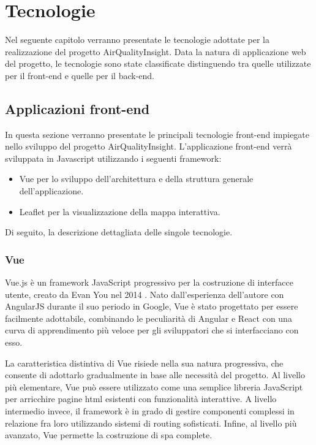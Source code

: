 \clearpage{\pagestyle{empty}\cleardoublepage}

\chapter{Tecnologie}
\label{chapter:second}

Nel seguente capitolo verranno presentate le tecnologie adottate per la realizzazione del progetto AirQualityInsight.
Data la natura di applicazione web del progetto, le tecnologie sono state classificate distinguendo tra quelle
utilizzate per il front-end e quelle per il back-end.

\section{Applicazioni front-end}

In questa sezione verranno presentate le principali tecnologie front-end impiegate nello sviluppo
del progetto AirQualityInsight.
L'applicazione front-end verrà sviluppata in Javascript utilizzando i seguenti framework:
\begin{itemize}
  \item Vue per lo sviluppo dell'architettura e della struttura generale dell'applicazione.
  \item Leaflet per la visualizzazione della mappa interattiva.
\end{itemize}

Di seguito, la descrizione dettagliata delle singole tecnologie.

\subsection{Vue}

Vue.js è un framework JavaScript progressivo per la costruzione di interfacce utente,
creato da Evan You nel 2014 \cite{vue2014}. Nato dall'esperienza dell'autore con AngularJS \cite{angularjs2010}
durante il suo periodo in Google, Vue è stato progettato per essere facilmente adottabile,
combinando le peculiarità di Angular e React \cite{react2013} con una curva di apprendimento più veloce
per gli sviluppatori che si interfacciano con esso.

La caratteristica distintiva di Vue risiede nella sua natura progressiva, che consente di adottarlo gradualmente in base
alle necessità del progetto. Al livello più elementare, Vue può essere utilizzato come una semplice libreria JavaScript
per arricchire pagine \acrshort{html} esistenti con funzionalità interattive. A livello intermedio invece, il framework
è in grado di gestire componenti complessi in relazione fra loro utilizzando sistemi di routing sofisticati. Infine,
al livello più avanzato, Vue permette la costruzione di \acrfull{spa} \cite{mdn2024spa} complete.

